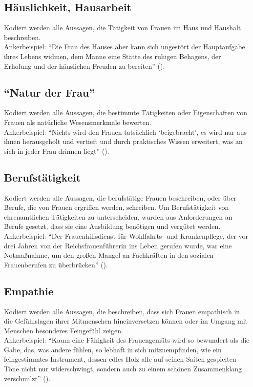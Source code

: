 \documentclass[12pt, titlepage=true, toc=bib]{scrartcl}
\begin{document}
{\subsection*{Häuslichkeit, Hausarbeit}

Kodiert werden alle Aussagen, die Tätigkeit von Frauen im Haus und Haushalt beschreiben.\\
Ankerbeispiel: "`Die Frau des Hauses aber kann sich ungestört der Hauptaufgabe ihres Lebens widmen, dem Manne eine Stätte des ruhigen Behagens, der Erholung und der häuslichen Freuden zu bereiten"' (\cite[5]{friewart_japanisches_1941}).

\subsection*{"`Natur der Frau"'}

Kodiert werden alle Aussagen, die bestimmte Tätigkeiten oder Eigenschaften von Frauen als natürliche Wesensmerkmale bewerten.\\
Ankerbeispiel: \enquote{Nichts wird den Frauen tatsächlich \enquote{beigebracht}, es wird nur aus ihnen herausgeholt und vertieft und durch praktisches Wissen erweitert, was an sich in jeder Frau drinnen liegt} (\cite[775]{a._v._s._kameradschaft_1936}).

\subsection*{Berufstätigkeit}

Kodiert werden alle Aussagen, die berufstätige Frauen beschreiben, oder über Berufe, die von Frauen ergriffen werden, schreiben. Um Berufstätigkeit von ehrenamtlichen Tätigkeiten zu unterscheiden, wurden aus Anforderungen an Berufe gesetzt, dass sie eine Ausbildung benötigen und vergütet werden.\\
Ankerbeispiel: "`Der Frauenhilfsdienst für Wohlfahrts- und Krankenpflege, der vor drei Jahren von der Reichsfrauenführerin ins Leben gerufen wurde, war eine Notmaßnahme, um den großen Mangel an Fachkräften in den sozialen Frauenberufen zu überbrücken"' (\cite[22]{reimer_glucklich_1941}).

\subsection*{Empathie}

Kodiert werden alle Aussagen, die beschreiben, dass sich Frauen empathisch in die Gefühlslagen ihrer Mitmenschen hineinversetzen können oder im Umgang mit Menschen besonderes Feingefühl zeigen.\\
Ankerbeispiel: "`Kaum eine Fähigkeit des Frauengemüts wird so bewundert als die Gabe, das, was andere fühlen, so lebhaft in sich mitzuempfinden, wie ein feingestimmtes Instrument, dessen edles Holz alle auf seinen Saiten gespielten Töne nicht nur widerschwingt, sondern auch zu einem schönen Zusammenklang verschmilzt"' (\cite[36]{weinhandl_wie_1941}).

}
\end{document}
